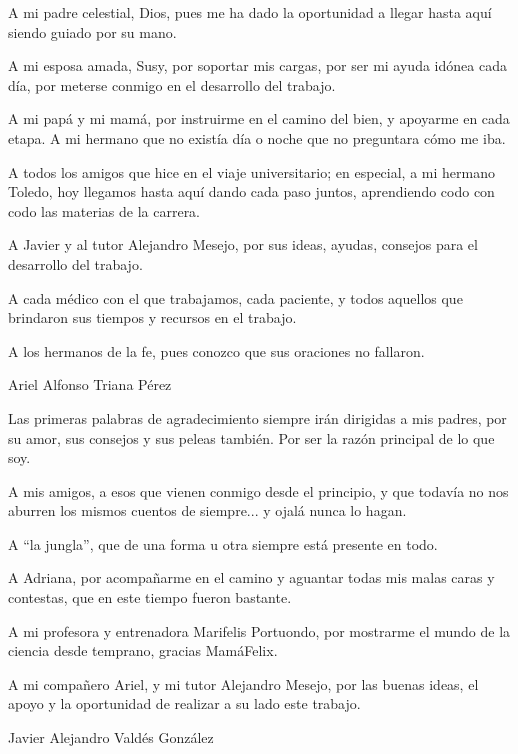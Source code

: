 \begin{acknowledgements}
A mi padre celestial, Dios, pues me ha dado la oportunidad a llegar hasta aquí siendo guiado por su mano.

A mi esposa amada, Susy, por soportar mis cargas, por ser mi ayuda idónea cada día, por meterse conmigo en el desarrollo del trabajo.

A mi papá y mi mamá, por instruirme en el camino del bien, y apoyarme en cada etapa. A mi hermano que no existía día o noche que no preguntara cómo me iba.

A todos los amigos que hice en el viaje universitario; en especial, a mi hermano Toledo, hoy llegamos hasta aquí dando cada paso juntos, aprendiendo codo con codo las materias de la carrera.

A Javier y al tutor Alejandro Mesejo, por sus ideas, ayudas, consejos para el desarrollo del trabajo. 

A cada médico con el que trabajamos, cada paciente, y todos aquellos que brindaron sus tiempos y recursos en el trabajo.

A los hermanos de la fe, pues conozco que sus oraciones no fallaron.

\begin{flushright}
	Ariel Alfonso Triana Pérez
\end{flushright}

Las primeras palabras de agradecimiento siempre irán dirigidas a mis padres, por su amor, sus consejos y sus peleas también. Por ser la razón principal de lo que soy.

A mis amigos, a esos que vienen conmigo desde el principio, y que todavía no nos aburren los mismos cuentos de siempre... y ojalá nunca lo hagan.

A ``la jungla'', que de una forma u otra siempre está presente en todo.

A Adriana, por acompañarme en el camino y aguantar todas mis malas caras y contestas, que en este tiempo fueron bastante.

A mi profesora y entrenadora Marifelis Portuondo, por mostrarme el mundo de la ciencia desde temprano, gracias MamáFelix.

A mi compañero Ariel, y mi tutor Alejandro Mesejo, por las buenas ideas, el apoyo y la oportunidad de realizar a su lado este trabajo.

\begin{flushright}
	Javier Alejandro Valdés González
\end{flushright}
\end{acknowledgements}